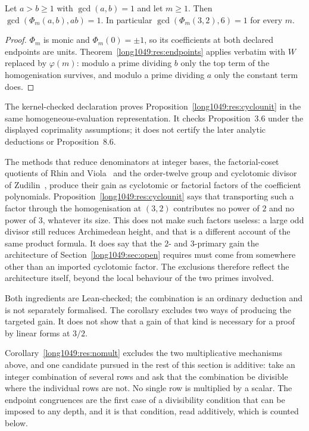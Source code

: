 \begin{proposition}
\label{long1049:res:cyclounit}
Let $a>b\ge1$ with $\gcd(a,b)=1$ and let $m\ge1$.  Then
$\gcd(\Phi_m(a,b),ab)=1$.  In particular $\gcd(\Phi_m(3,2),6)=1$ for every $m$.
\end{proposition}

\begin{proof}
$\Phi_m$ is monic and $\Phi_m(0)=\pm1$, so its coefficients at both declared
endpoints are units.  Theorem~\ref{long1049:res:endpoints} applies verbatim with $W$
replaced by $\varphi(m)$: modulo a prime dividing $b$ only the top term of the
homogenisation survives, and modulo a prime dividing $a$ only the constant term
does.
\end{proof}

The kernel-checked declaration
proves Proposition~\ref{long1049:res:cyclounit} in the same homogeneous-evaluation
representation.  It checks Proposition~3.6 under the displayed coprimality
assumptions; it does not certify the later analytic deductions or
Proposition~8.6.

The methods that reduce denominators at integer bases, the factorial-coset
quotients of Rhin and Viola~\cite{rhinviola1996} and the order-twelve group and
cyclotomic divisor of Zudilin~\cite{zudilin2004}, produce their gain as
cyclotomic or factorial factors of the coefficient polynomials.
Proposition~\ref{long1049:res:cyclounit} says that transporting such a factor through the
homogenisation at $(3,2)$ contributes no power of $2$ and no power of $3$,
whatever its size.  This does not make such factors useless: a large odd
divisor still reduces Archimedean height, and that is a different account of the
same product formula.  It does say that the $2$- and $3$-primary gain the
architecture of Section~\ref{long1049:sec:open} requires must come from somewhere other
than an imported cyclotomic factor.  The exclusions therefore reflect the
architecture itself, beyond the local behaviour of the two primes involved.

\noindent Both ingredients are Lean-checked; the combination is an ordinary
deduction and is not separately formalised.  The corollary excludes two ways of
producing the targeted gain.  It does not show that a gain of that kind is
necessary for a proof by linear forms at \(3/2\).

Corollary~\ref{long1049:res:nomult} excludes the two multiplicative mechanisms above,
and one candidate pursued in the rest of this section is additive: take an
integer combination of several rows and ask that the combination be divisible
where the individual rows are not.  No single row is multiplied by a scalar.  The endpoint
congruences are the first case of a divisibility condition that can be imposed
to any depth, and it is that condition, read additively, which is counted
below.

